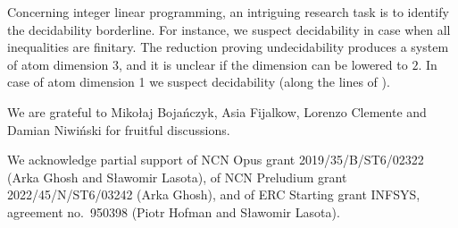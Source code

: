 \begin{question}
Concerning integer linear programming,
an intriguing research task is to identify the decidability borderline.
For instance, we suspect decidability in case when all inequalities are finitary.
The reduction proving undecidability produces a system of atom dimension $3$, and it is unclear if the dimension can be lowered
to $2$.
In case of atom dimension 1 we suspect decidability (along the lines of \cite{HLT17}).
\end{question}





\begin{acks}
We are grateful to Miko{\l}aj Boja{\'n}czyk, Asia Fijalkow, Lorenzo Clemente and Damian Niwi{\'n}ski 
for fruitful discussions.

We acknowledge partial support of 
NCN Opus grant 2019/35/B/ST6/02322 (Arka Ghosh and S{\l}awomir Lasota),
of NCN Preludium grant 2022/45/N/ST6/03242 (Arka Ghosh),
and of
ERC Starting grant INFSYS, agreement no.~950398 (Piotr Hofman and S{\l}awomir Lasota).
\end{acks}




\appendix







